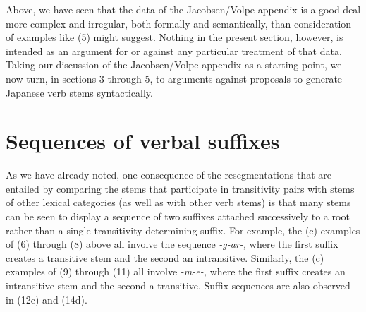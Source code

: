 \documentclass[output=paper,
modfonts
]{LSP/langsci}
\begin{document}
Above, we have seen that the data of the Jacobsen/Volpe appendix is a
good deal more complex and irregular, both formally and semantically,
than consideration of examples like (5) might suggest. Nothing in the
present section, however, is intended as an argument for or against any
particular treatment of that data. Taking our discussion of the
Jacobsen/Volpe appendix as a starting point, we now turn, in sections 3
through 5, to arguments against proposals to generate Japanese verb
stems syntactically.

\section{Sequences of verbal suffixes}\label{sequences}

As we have already noted, one consequence of the resegmentations that
are entailed by comparing the stems that participate in transitivity
pairs with stems of other lexical categories (as well as with other verb
stems) is that many stems can be seen to display a sequence of two
suffixes attached successively to a root rather than a single
transitivity-determining suffix. For example, the (c) examples of (6)
through (8) above all involve the sequence \textit{-g-ar-,} where the
first suffix creates a transitive stem and the second an intransitive.
Similarly, the (c) examples of (9) through (11) all involve
\textit{-m-e-,} where the first suffix creates an intransitive stem and
the second a transitive. Suffix sequences are also observed in (12c) and
(14d).
\end{document}
